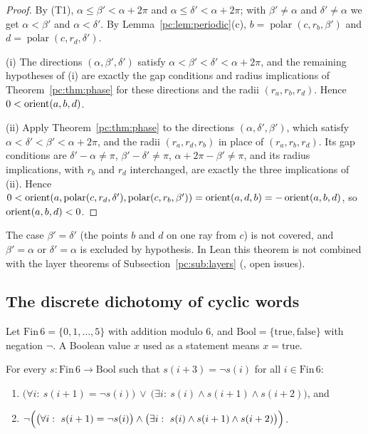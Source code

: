 \begin{proof}
By (T1), $\alpha\le\beta'<\alpha+2\pi$ and $\alpha\le\delta'<\alpha+2\pi$; with $\beta'\neq\alpha$ and
$\delta'\neq\alpha$ we get $\alpha<\beta'$ and $\alpha<\delta'$. By Lemma~\ref{pc:lem:periodic}(c),
$b=\operatorname{polar}(c,r_b,\beta')$ and $d=\operatorname{polar}(c,r_d,\delta')$.

(i) The directions $(\alpha,\beta',\delta')$ satisfy $\alpha<\beta'<\delta'<\alpha+2\pi$, and the remaining
hypotheses of (i) are exactly the gap conditions and radius implications of Theorem~\ref{pc:thm:phase} for these
directions and the radii $(r_a,r_b,r_d)$. Hence $0<\operatorname{orient}(a,b,d)$.

(ii) Apply Theorem~\ref{pc:thm:phase} to the directions $(\alpha,\delta',\beta')$, which satisfy
$\alpha<\delta'<\beta'<\alpha+2\pi$, and the radii $(r_a,r_d,r_b)$ in place of $(r_a,r_b,r_d)$. Its gap conditions
are $\delta'-\alpha\neq\pi$, $\beta'-\delta'\neq\pi$, $\alpha+2\pi-\beta'\neq\pi$, and its radius implications,
with $r_b$ and $r_d$ interchanged, are exactly the three implications of (ii). Hence
$0<\operatorname{orient}(a,\operatorname{polar}(c,r_d,\delta'),\operatorname{polar}(c,r_b,\beta'))=\operatorname{orient}(a,d,b)=-\operatorname{orient}(a,b,d)$,
so $\operatorname{orient}(a,b,d)<0$.
\end{proof}

\begin{remark}\label{pc:rem:sign-scope}
The case $\beta'=\delta'$ (the points $b$ and $d$ on one ray from $c$) is not covered, and $\beta'=\alpha$ or
$\delta'=\alpha$ is excluded by hypothesis. In Lean this theorem is not combined with the layer theorems of
Subsection~\ref{pc:sub:layers} (, open issues).
\end{remark}

\subsection{The discrete dichotomy of cyclic words}

Let $\mathrm{Fin}\,6=\{0,1,\dots,5\}$ with addition modulo $6$, and $\mathrm{Bool}=\{\mathrm{true},\mathrm{false}\}$
with negation $\neg$. A Boolean value $x$ used as a statement means $x=\mathrm{true}$.

\begin{theorem}\label{pc:thm:word}
For every $s\colon\mathrm{Fin}\,6\to\mathrm{Bool}$ such that $s(i+3)=\neg s(i)$ for all $i\in\mathrm{Fin}\,6$:
\begin{enumerate}[label=(\roman*)]
\item $\bigl(\forall i:\ s(i+1)=\neg s(i)\bigr)\ \vee\ \bigl(\exists i:\ s(i)\wedge s(i+1)\wedge s(i+2)\bigr)$, and
\item $\neg\Bigl(\bigl(\forall i:\ s(i+1)=\neg s(i)\bigr)\wedge\bigl(\exists i:\ s(i)\wedge s(i+1)\wedge s(i+2)\bigr)\Bigr)$.
\end{enumerate}
\end{theorem}

